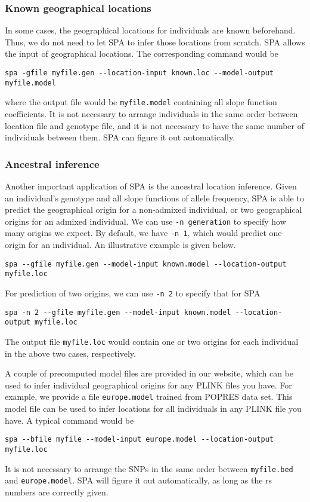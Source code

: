 \documentclass[12pt]{article}
\begin{document}
\subsubsection*{Known geographical locations}

In some cases, the geographical locations for individuals are known beforehand. Thus, we do not need
to let SPA to infer those locations from scratch. SPA allows the input of geographical locations.
The corresponding command would be
\begin{verbatim}
spa -gfile myfile.gen --location-input known.loc --model-output myfile.model
\end{verbatim} 
where the output file would be \verb+myfile.model+ containing all slope function coefficients.
It is not necessary to arrange individuals in the same order between location file and genotype
file, and it is not necessary to have the same number of individuals between them. SPA can figure it
out automatically. 

\subsubsection*{Ancestral inference}

Another important application of SPA is the ancestral location inference. Given an individual's
genotype and all slope functions of allele frequency, SPA is able to predict the geographical origin
for a non-admixed individual, or two geographical origins for an admixed individual. We can use
\verb+-n generation+ to specify how many origins we expect. By default, we have \verb+-n 1+, which
would predict one origin for an individual. An illustrative example is given below. 
\begin{verbatim}
spa --gfile myfile.gen --model-input known.model --location-output myfile.loc
\end{verbatim}
For prediction of two origins, we can use \verb+-n 2+ to specify that for SPA
\begin{verbatim}
spa -n 2 --gfile myfile.gen --model-input known.model --location-output myfile.loc
\end{verbatim}
The output file \verb+myfile.loc+ would contain one or two origins for each individual in the above
two cases, respectively.

A couple of precomputed model files are provided in our website, which can be used to infer
individual geographical origins for any PLINK files you have. For example, we provide a file
\verb+europe.model+ trained from POPRES data set. This model file can be used to infer locations for
all individuals in any PLINK file you have. A typical command would be
\begin{verbatim}
spa --bfile myfile --model-input europe.model --location-output myfile.loc
\end{verbatim} 
It is not necessary to arrange the SNPs in the same order between \verb+myfile.bed+ and
\verb+europe.model+. SPA will figure it out automatically, as long as the rs numbers are correctly
given. 
\end{document}
